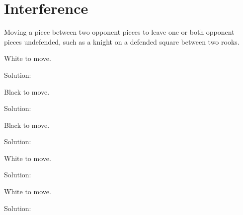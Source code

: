 \documentclass{book}
\begin{document}
\section{Interference}
Moving a piece between two opponent pieces to leave one or both opponent pieces undefended, such as a knight on a defended square between two rooks.\begin{multicols}{2} 
\begin{samepage} 
\newgame 


 
\showboard
 
 White to move. 
 
Solution: 
 
\end{samepage}\begin{samepage} 
\newgame 


 
\showboard
 
 Black to move. 
 
Solution: 
 
\end{samepage}\begin{samepage} 
\newgame 


 
\showboard
 
 Black to move. 
 
Solution: 
 
\end{samepage}\begin{samepage} 
\newgame 


 
\showboard
 
 White to move. 
 
Solution: 
 
\end{samepage}\begin{samepage} 
\newgame 


 
\showboard
 
 White to move. 
 
Solution: 
 
\end{samepage}\end{multicols} 
\newpage 
\end{document}
